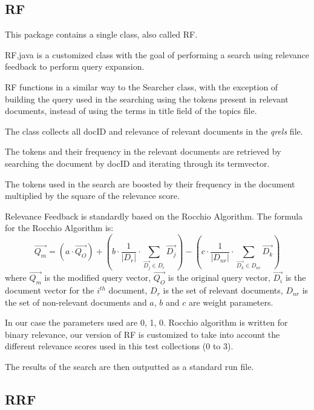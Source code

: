 \subsection{RF}
  
      This package contains a single class, also called RF.
        
        RF.java is a customized class with the goal of performing a search using relevance feedback to perform query expansion.
        
        RF functions in a similar way to the Searcher class, with the exception of building the query used in the searching using the tokens present in relevant documents, instead of using the terms in title field of the topics file.
        
        The class collects all docID and relevance of relevant documents in the \textit{qrels} file.
        
        The tokens and their frequency in the relevant documents are retrieved by searching the document by docID and iterating through its termvector.
        
        The tokens used in the search are boosted by their frequency in the document multiplied by the square of the relevance score.
        
        Relevance Feedback is standardly based on the Rocchio Algorithm.
        The formula for the Rocchio Algorithm is:
        $$
        \overrightarrow{Q_{m}}=
        \left(a\cdot\overrightarrow{Q_{O}}\right)+
        \left(b\cdot\frac{1}{|D_{r}|}\cdot\sum_{\overrightarrow{D_{j}}\in D_{r}}\overrightarrow{D_{j}}\right)-
        \left(c\cdot\frac{1}{|D_{nr}|}\cdot\sum_{\overrightarrow{D_{k}}\in D_{nr}}\overrightarrow{D_{k}}\right)
        $$
        where $\overrightarrow{Q_{m}}$ is the modified query vector, $\overrightarrow{Q_{O}}$ is the original query vector, $\overrightarrow{D_{i}}$ is the document vector for the $i^{th}$ document, $D_{r}$ is the set of relevant documents, $D_{nr}$ is the set of non-relevant documents and $a$, $b$ and $c$ are weight parameters.
        
        In our case the parameters used are 0, 1, 0.
        Rocchio algorithm is written for binary relevance, our version of RF is customized to take into account the different relevance scores used in this test collections (0 to 3).
        
        The results of the search are then outputted as a standard run file.
        
\subsection{RRF}
  
